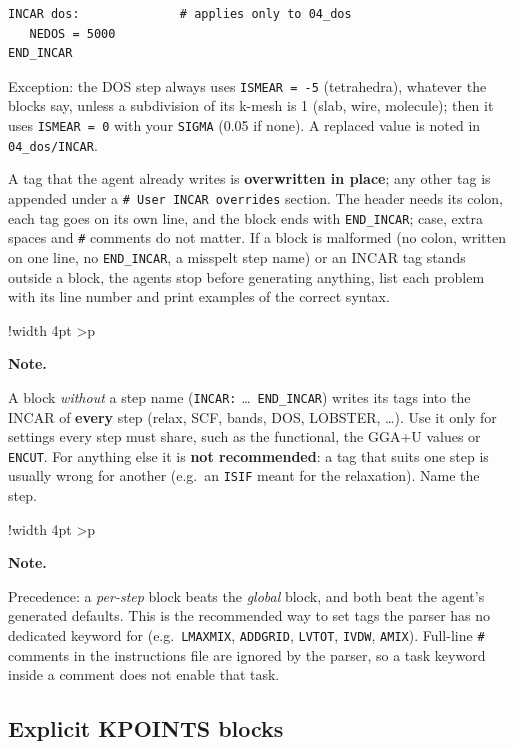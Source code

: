 \documentclass[11pt,a4paper]{scrartcl}
\newlength{\boxwidth}
\newenvironment{notebox}{%
  \par\vspace{6pt}%
  \setlength{\tabcolsep}{5pt}%
  \setlength{\boxwidth}{\dimexpr\linewidth - 4pt - 2\tabcolsep}%
  \noindent\begin{tabular}{!{\color{notebar}\vrule width 4pt}%
      >{\columncolor{notebg}}p{\boxwidth}}%
  \rule{0pt}{11pt}\textbf{\textcolor{notebar}{Note.}}\enspace\ignorespaces%
}{%
  \rule[-4pt]{0pt}{4pt}%
  \end{tabular}\par\vspace{6pt}%
}
\begin{document}
\begin{lstlisting}
INCAR dos:              # applies only to 04_dos
   NEDOS = 5000
END_INCAR
\end{lstlisting}

Exception: the DOS step always uses \texttt{ISMEAR = -5} (tetrahedra), whatever the blocks
say, unless a subdivision of its k-mesh is 1 (slab, wire, molecule); then it uses
\texttt{ISMEAR = 0} with your \texttt{SIGMA} (0.05 if none).  A replaced value is noted in
\texttt{04\_dos/INCAR}.

A tag that the agent already writes is \textbf{overwritten in place}; any other tag is
appended under a \texttt{\# User INCAR overrides} section.  The header needs its colon,
each tag goes on its own line, and the block ends with \texttt{END\_INCAR}; case, extra
spaces and \texttt{\#} comments do not matter.  If a block is malformed (no colon, written
on one line, no \texttt{END\_INCAR}, a misspelt step name) or an INCAR tag stands outside a
block, the agents stop before generating anything, list each problem with its line
number and print examples of the correct syntax.

\begin{notebox}
A block \emph{without} a step name (\texttt{INCAR:} \ldots\ \texttt{END\_INCAR}) writes its
tags into the INCAR of \textbf{every} step (relax, SCF, bands, DOS, LOBSTER, \ldots).
Use it only for settings every step must share, such as the functional, the GGA+U
values or \texttt{ENCUT}.  For anything else it is \textbf{not recommended}: a tag that
suits one step is usually wrong for another (e.g.\ an \texttt{ISIF} meant for the
relaxation).  Name the step.
\end{notebox}

\begin{notebox}
Precedence: a \emph{per-step} block beats the \emph{global} block, and
both beat the agent's generated defaults.  This is the recommended way to
set tags the parser has no dedicated keyword for (e.g.\ \texttt{LMAXMIX},
\texttt{ADDGRID}, \texttt{LVTOT}, \texttt{IVDW}, \texttt{AMIX}).
Full-line \texttt{\#} comments in the instructions file are ignored by
the parser, so a task keyword inside a comment does not enable that task.
\end{notebox}

\subsection{Explicit KPOINTS blocks}
\label{sec:kpoints-block}
\end{document}
